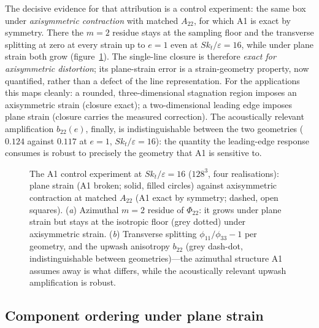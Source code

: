 \documentclass[11pt,a4paper]{article}
\begin{document}
The decisive evidence for that attribution is a control experiment: the
same box under \emph{axisymmetric contraction} with matched $A_{22}$, for
which A1 is exact by symmetry. There the $m=2$ residue stays at the
sampling floor and the transverse splitting at zero at every strain up to
$e=1$ even at $Sk_t/\varepsilon=16$, while under plane strain both grow
(figure~\ref{fig:a1control}). The single-line closure is therefore
\emph{exact for axisymmetric distortion}; its plane-strain error is a
strain-geometry property, now quantified, rather than a defect of the line
representation. For the applications this maps cleanly: a rounded,
three-dimensional stagnation region imposes an axisymmetric strain (closure
exact); a two-dimensional leading edge imposes plane strain (closure
carries the measured correction). The acoustically relevant amplification
$b_{22}(e)$, finally, is indistinguishable between the two geometries
($0.124$ against $0.117$ at $e=1$, $Sk_t/\varepsilon=16$): the quantity the
leading-edge response consumes is robust to precisely the geometry that A1
is sensitive to.

\begin{figure}
  \centering
  \caption{The A1 control experiment at $Sk_t/\varepsilon=16$ ($128^3$,
  four realisations): plane strain (A1 broken; solid, filled circles)
  against axisymmetric contraction at matched $A_{22}$ (A1 exact by
  symmetry; dashed, open squares). (\textit{a}) Azimuthal $m=2$ residue of
  $\Phi_{22}$: it grows under plane strain but stays at the isotropic
  floor (grey dotted) under axisymmetric strain. (\textit{b}) Transverse
  splitting $\phi_{11}/\phi_{33}-1$ per geometry, and the upwash
  anisotropy $b_{22}$ (grey dash-dot, indistinguishable between
  geometries)---the azimuthal structure A1 assumes away is what differs,
  while the acoustically relevant upwash amplification is robust.}
  \label{fig:a1control}
\end{figure}

\subsection{Component ordering under plane strain}\label{sec:order}
\end{document}
